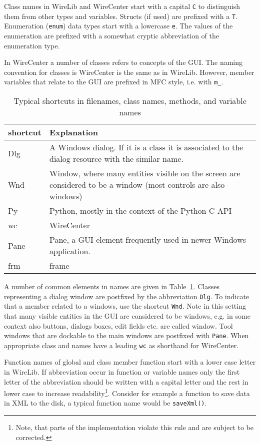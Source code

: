 \documentclass[11pt,a4paper,onepage,openany]{book}
\begin{document}
Class names in WireLib and WireCenter start with a capital \texttt{C} to
distinguish them from other types and variables. Structs (if used) are prefixed
with a \texttt{T}. Enumeration (\texttt{enum}) data types start with a
lowercase \texttt{e}. The values of the enumeration are prefixed with a
somewhat cryptic abbreviation of the enumeration type.

In WireCenter a number of classes refers to concepts of the GUI. The naming
convention for classes is WireCenter is the same as in WireLib. However, member
variables that relate to the GUI are prefixed in MFC style, i.e. with
\texttt{m\_}.

\begin{table}[tbp]
\centering
\caption{Typical shortcuts in filenames, class names, methods, and variable
names}\label{tab:Shortcuts}
\begin{tabular}{p{}p{}}
\hline
  shortcut & Explanation \\
  \hline
  Dlg & A Windows dialog. If it is a class it is associated to the dialog
  resource with the similar name.\\
  Wnd & Window, where many entities visible on the screen are considered to be
  a window (most controls are also windows)\\
  Py & Python, mostly in the context of the Python C-API\\
  wc & WireCenter\\
  Pane & Pane, a GUI element frequently used in newer Windows application.\\
  frm & frame\\
  \hline
\end{tabular}
\end{table}

A number of common elements in names are given in Table~\ref{tab:Shortcuts}.
Classes representing a dialog window are postfixed by the abbreviation
\texttt{Dlg}. To indicate that a member related to a windows, use the shortcut
\texttt{Wnd}. Note in this setting that many visible entities in the GUI are
considered to be windows, e.g. in some context also buttons, dialogs boxes,
edit fields etc. are called window. Tool windows that are dockable to the main
windows are postfixed with \texttt{Pane}. When appropriate class and names have
a leading \texttt{wc} as shorthand for WireCenter.

Function names of global and class member function start with a lower case
letter in WireLib. If abbreviation occur in function or variable names only the
first letter of the abbreviation should be written with a capital letter and
the rest in lower case to increase readability\footnote{Note, that parts of the
implementation violate this rule and are subject to be corrected.}. Consider
for example a function to save data in XML to the disk, a typical function name
would be \texttt{saveXml()}.
\end{document}
